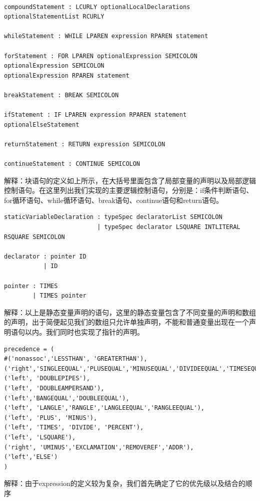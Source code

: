 \documentclass{article}
\begin{document}
\begin{verbatim}

compoundStatement : LCURLY optionalLocalDeclarations optionalStatementList RCURLY

whileStatement : WHILE LPAREN expression RPAREN statement

forStatement : FOR LPAREN optionalExpression SEMICOLON optionalExpression SEMICOLON 
optionalExpression RPAREN statement

breakStatement : BREAK SEMICOLON

ifStatement : IF LPAREN expression RPAREN statement optionalElseStatement

returnStatement : RETURN expression SEMICOLON

continueStatement : CONTINUE SEMICOLON

\end{verbatim}

解释：块语句的定义如上所示，在大括号里面包含了局部变量的声明以及局部逻辑控制语句。在这里列出我们实现的主要逻辑控制语句，分别是：if条件判断语句、for循环语句、while循环语句、break语句、continue语句和return语句。

\begin{verbatim}
staticVariableDeclaration : typeSpec declaratorList SEMICOLON
                          | typeSpec declarator LSQUARE INTLITERAL RSQUARE SEMICOLON

declarator : pointer ID
           | ID

pointer : TIMES
        | TIMES pointer
\end{verbatim}

解释：以上是静态变量声明的语句，这里的静态变量包含了不同变量的声明和数组的声明，出于简便起见我们的数组只允许单独声明，不能和普通变量出现在一个声明语句以内。我们同时也实现了指针的声明。

\begin{verbatim}
precedence = (
#('nonassoc','LESSTHAN', 'GREATERTHAN'),
('right','SINGLEEQUAL','PLUSEQUAL','MINUSEQUAL','DIVIDEEQUAL','TIMESEQUAL'),
('left', 'DOUBLEPIPES'),
('left', 'DOUBLEAMPERSAND'),
('left','BANGEQUAL','DOUBLEEQUAL'),
('left', 'LANGLE','RANGLE','LANGLEEQUAL','RANGLEEQUAL'),
('left', 'PLUS', 'MINUS'),
('left', 'TIMES', 'DIVIDE', 'PERCENT'),
('left', 'LSQUARE'),
('right', 'UMINUS','EXCLAMATION','REMOVEREF','ADDR'),
('left','ELSE')
)
\end{verbatim}

解释：由于expression的定义较为复杂，我们首先确定了它的优先级以及结合的顺序
\end{document}

